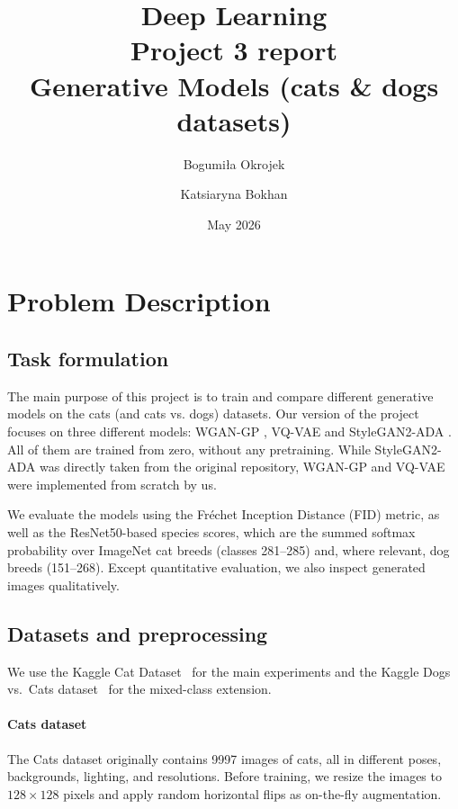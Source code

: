 \documentclass{article}
\title{Deep Learning\\ Project 3 report \\ Generative Models (cats \& dogs datasets)}
\date{May 2026}
\author{Bogumiła Okrojek \and Katsiaryna Bokhan}
\begin{document}
\maketitle



\begin{center}
\begin{minipage}{0.8\textwidth}

\begin{abstract}
\end{abstract}

\end{minipage}
\end{center}

\newpage
\tableofcontents


\newpage

\section{Problem Description}

\subsection{Task formulation}
The main purpose of this project is to train and compare different generative models on the cats (and cats vs. dogs) datasets. Our version of the project
focuses on three different models: WGAN-GP \cite{wgangp}, VQ-VAE \cite{vqvae} and StyleGAN2-ADA \cite{stylegan2ada}. All of them are trained from zero, without any pretraining. While StyleGAN2-ADA was directly taken from the original repository, WGAN-GP and VQ-VAE were implemented from scratch by us.

We evaluate the models using the Fr\'echet Inception Distance (FID) metric, as well as the ResNet50-based species scores, which are the summed softmax probability over ImageNet cat breeds (classes 281--285) and, where relevant, dog breeds (151--268). Except quantitative evaluation, we also inspect 
generated images qualitatively.

\subsection{Datasets and preprocessing}

We use the Kaggle Cat Dataset~\cite{crawford2018cat} for the main experiments and the
Kaggle Dogs vs.\ Cats dataset~\cite{kaggle2013dogsvscats} for the mixed-class extension.

\paragraph{Cats dataset} 
The Cats dataset originally contains 9997 images of cats, all in different poses, backgrounds, lighting, and resolutions.
Before training, we resize the images to $128\times128$ pixels and apply random horizontal flips as on-the-fly augmentation.
\end{document}
